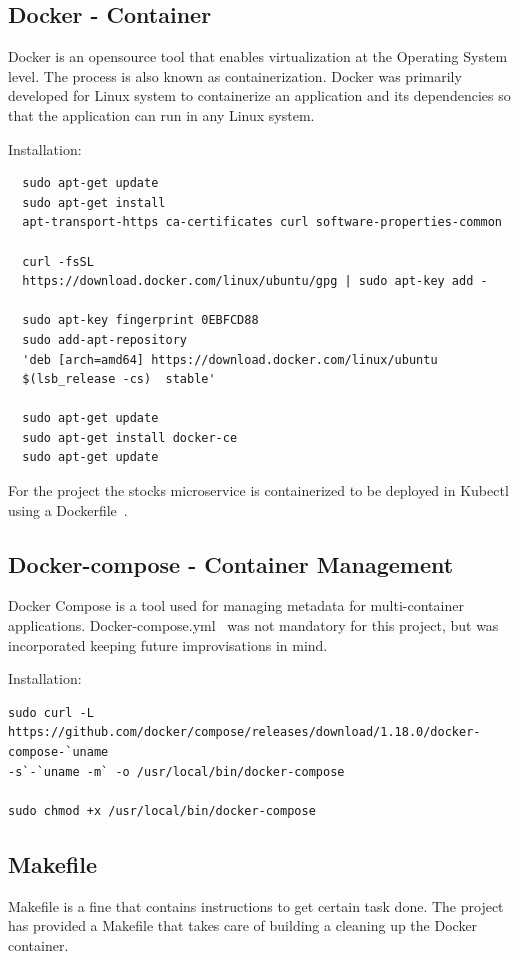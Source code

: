 \subsection{Docker - Container}
Docker is an opensource tool that enables virtualization at the Operating
System level. The process is also known as containerization. Docker was
primarily developed for Linux system to containerize an application and its
dependencies so that the application can run in any Linux system.

Installation:
\begin{verbatim}
  sudo apt-get update
  sudo apt-get install 
  apt-transport-https ca-certificates curl software-properties-common

  curl -fsSL 
  https://download.docker.com/linux/ubuntu/gpg | sudo apt-key add -

  sudo apt-key fingerprint 0EBFCD88
  sudo add-apt-repository 
  'deb [arch=amd64] https://download.docker.com/linux/ubuntu 
  $(lsb_release -cs)  stable'

  sudo apt-get update
  sudo apt-get install docker-ce
  sudo apt-get update
\end{verbatim}
For the project the stocks microservice is containerized to be deployed in
Kubectl using a Dockerfile~\cite{hid-sp18-417-Dockerfile}.

\subsection{Docker-compose - Container Management}
Docker Compose is a tool used for managing metadata for multi-container
applications. Docker-compose.yml~\cite{hid-sp18-417-docker-compose} was not
mandatory for this project, but was incorporated keeping future improvisations
in mind. 

Installation:

\begin{verbatim}
sudo curl -L 
https://github.com/docker/compose/releases/download/1.18.0/docker-compose-`uname 
-s`-`uname -m` -o /usr/local/bin/docker-compose

sudo chmod +x /usr/local/bin/docker-compose
\end{verbatim}
\subsection{Makefile}
Makefile is a fine that contains instructions to get certain task done. The
project has provided a Makefile that takes care of building a cleaning up the
Docker container.

